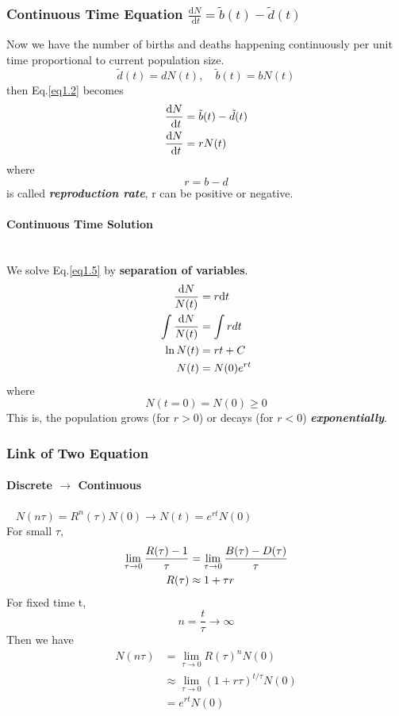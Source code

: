 \documentclass[12pt, a4paper, oneside]{article}
\newcommand{\myref}[1]{Eq.\ref{#1}}
\begin{document}
\newpage

\subsubsection{Continuous Time Equation $\frac{\mathrm{d} N}{\mathrm{~d} t}=\tilde{b}(t)-\tilde{d}(t)$}
Now we have the number of births and deaths happening continuously per unit time proportional to current population size.
$$
    \tilde{d}(t)=d N(t), \quad \tilde{b}(t)=b N(t)
$$
then \myref{eq1.2} becomes
\begin{align}
    \frac{\mathrm{d} N}{\mathrm{~d} t} & =\tilde{b}(t)-\tilde{d}(t)\notag \\
    \frac{\mathrm{d} N}{\mathrm{~d} t} & =rN(t) \label{eq1.5}
\end{align}
where
$$
    r=b-d
$$
is called \emph{\textbf{reproduction rate}}, r can be positive or negative.

\paragraph{Continuous Time Solution}~{}\\
We solve \myref{eq1.5} by \textbf{separation of variables}.
\begin{align}
    \frac{\mathrm{d}N}{N(t)}      & =r\mathrm{d}t \notag \\
    \int \frac{\mathrm{d}N}{N(t)} & =\int r d t \notag   \\
    \ln N(t)                      & =rt+C\notag          \\
    N(t)                          & = N(0)e^{rt}
\end{align}
where
$$
    N(t=0)=N(0)\geq 0
$$
This is, the population grows (for $r>0$) or decays (for $r<0$) \emph{\textbf{exponentially}}.

\newpage

\subsubsection{Link of Two Equation}

\paragraph{Discrete $\rightarrow$ Continuous}~{
$
    N(n\tau) = R^n(\tau) N(0)  \rightarrow N(t) = e^{rt}N(0)
$}\\
For small $\tau$,
\begin{align}
    \lim _{\tau \rightarrow 0} \frac{R(\tau)-1}{\tau} & = \lim _{\tau \rightarrow 0}\frac{B(\tau)-D(\tau)}{\tau}\notag \\
    R(\tau)                                           & \approx 1+\tau r\label{eq1.6}
\end{align}
For fixed time t,
$$
    n=\frac{t}{\tau} \rightarrow \infty
$$
Then we have
\begin{align*}
    N(n \tau) & =\lim_{\tau \rightarrow 0}R(\tau)^nN(0)                      \\
              & \approx \lim _{\tau \rightarrow 0}(1+r \tau)^{t / \tau} N(0) \\
              & =e^{rt}N(0)
\end{align*}
\end{document}
